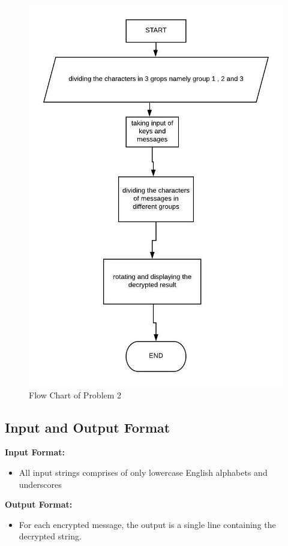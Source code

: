 \documentclass[12pt]{article}
\begin{document}
			\begin{figure}[h!]
				\centering
				\caption{Flow Chart of Problem 2}
				\includegraphics[scale=.8]{ps2f1.jpeg}
			\end{figure}
		
		
		\subsection{Input and Output Format}
			\textbf{Input Format:}
			\begin{itemize}
				\item All input strings comprises of only lowercase English alphabets and underscores
				
			 
			\end{itemize}
			\textbf{Output Format:}
			\begin{itemize}
				\item  For each encrypted message, the output is a single line containing the decrypted string.
				
				
			\end{itemize}
\end{document}
